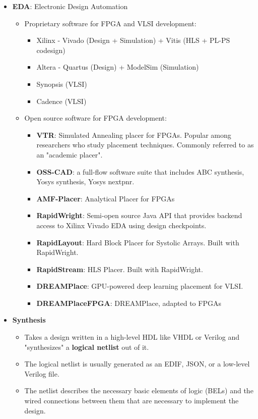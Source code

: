 \documentclass{article}
\begin{document}
\begin{itemize}[label={\textbullet}, left=0.25cm]
        \item \textbf{EDA}: Electronic Design Automation
        \begin{itemize}[label={--}, left=0.25cm]
            \item Proprietary software for FPGA and VLSI development:
            \begin{itemize}[label={$\cdot$}, left=0.25cm]
                \item Xilinx - Vivado (Design + Simulation) + Vitis (HLS + PL-PS codesign)
                \item Altera - Quartus (Design) + ModelSim (Simulation)
                \item Synopsis (VLSI)
                \item Cadence (VLSI)
            \end{itemize}
            \item Open source software for FPGA development:
            \begin{itemize}[label={$\cdot$}, left=0.25cm]
                \item \textbf{VTR}: Simulated Annealing placer for FPGAs. Popular among researchers who study placement techniques. 
                    Commonly referred to as an "academic placer".
                \item \textbf{OSS-CAD}: a full-flow software suite that includes ABC synthesis, Yosys synthesis, Yosys nextpnr.
                \item \textbf{AMF-Placer}: Analytical Placer for FPGAs
                \item \textbf{RapidWright}: Semi-open source Java API that provides backend access to Xilinx Vivado EDA using design checkpoints.
                \item \textbf{RapidLayout}: Hard Block Placer for Systolic Arrays. Built with RapidWright.
                \item \textbf{RapidStream}: HLS Placer. Built with RapidWright.
                \item \textbf{DREAMPlace}: GPU-powered deep learning placement for VLSI.
                \item \textbf{DREAMPlaceFPGA}: DREAMPlace, adapted to FPGAs
            \end{itemize}
        \end{itemize}
        
        \item \textbf{Synthesis}
        \begin{itemize}[label={--}, left=0.25cm]
            \item Takes a design written in a high-level HDL like VHDL or Verilog and "synthesizes" a \textbf{logical netlist} out of it. 
            \item The logical netlist is usually generated as an EDIF, JSON, or a low-level Verilog file. 
            \item The netlist describes the necessary basic elements of logic (BELs) and the wired connections between them that are necessary to implement the design.
        \end{itemize}


\end{itemize}
\end{document}
